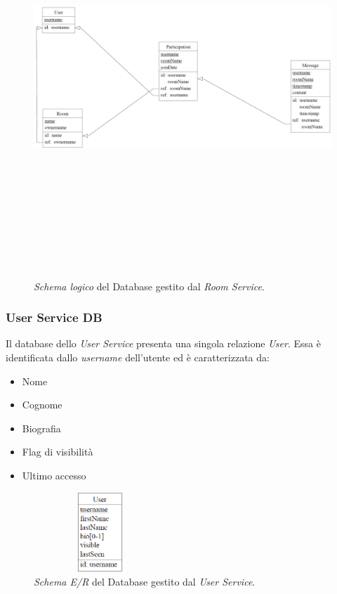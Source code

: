 \begin{figure}
    \centering
  \includegraphics[height=15cm, width=12cm,
		keepaspectratio]{images/RoomServiceDBLogic.png}
  \caption{\textit{Schema logico} del Database gestito dal \textit{Room Service}.}
  \label{fig:room-service-logic-schema}
\end{figure}


\subsubsection{User Service DB}
Il database dello \textit{User Service} presenta una singola relazione \textit{User}. Essa è identificata dallo \textit{username} dell'utente ed è caratterizzata da: 
\begin{itemize}
    \item Nome
    \item Cognome
    \item Biografia
    \item Flag di visibilità
    \item Ultimo accesso
\end{itemize}
\begin{figure}
  \includegraphics[width=5cm, height=3cm, keepaspectratio]{images/UserServiceER.PNG}
  \centering
  \caption{\textit{Schema E/R} del Database gestito dal \textit{User Service}.}
  \label{fig:user-service-er-schema}
\end{figure}

